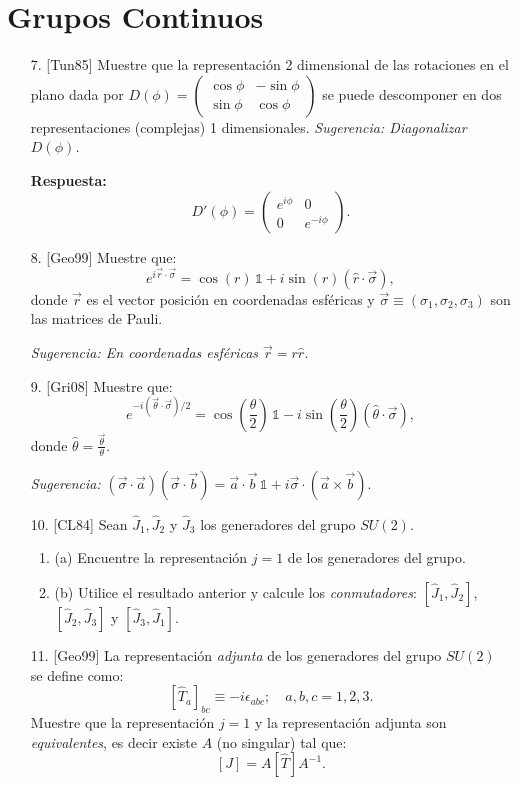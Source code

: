 \documentclass[a4paper,12pt]{article}
\begin{document}
\section*{Grupos Continuos}

\begin{enumerate}
    \item [7.] [Tun85] Muestre que la representación 2 dimensional de las rotaciones en el plano dada por $D(\phi) = \begin{pmatrix} \cos \phi & -\sin \phi \\ \sin \phi & \cos \phi \end{pmatrix}$ se puede descomponer en dos representaciones (complejas) 1 dimensionales. \textit{Sugerencia: Diagonalizar $D(\phi)$.}

    \textbf{Respuesta:}
    $$
    D'(\phi) = \begin{pmatrix} e^{i\phi} & 0 \\ 0 & e^{-i\phi} \end{pmatrix}.
    $$

    \item [8.] [Geo99] Muestre que:
    $$
    e^{i\vec{r} \cdot \vec{\sigma}} = \cos(r) \, \mathbb{1} + i \sin(r) (\hat{r} \cdot \vec{\sigma}),
    $$
    donde $\vec{r}$ es el vector posición en coordenadas esféricas y $\vec{\sigma} \equiv (\sigma_1, \sigma_2, \sigma_3)$ son las matrices de Pauli.

    \textit{Sugerencia: En coordenadas esféricas $\vec{r} = r \hat{r}$.}

    \item [9.] [Gri08] Muestre que:
    $$
    e^{-i(\vec{\theta} \cdot \vec{\sigma})/2} = \cos\left(\frac{\theta}{2}\right) \, \mathbb{1} - i \sin\left(\frac{\theta}{2}\right) (\hat{\theta} \cdot \vec{\sigma}),
    $$
    donde $\hat{\theta} = \frac{\vec{\theta}}{\theta}$.

    \textit{Sugerencia:} $(\vec{\sigma} \cdot \vec{a})(\vec{\sigma} \cdot \vec{b}) = \vec{a} \cdot \vec{b} \, \mathbb{1} + i \vec{\sigma} \cdot (\vec{a} \times \vec{b})$.

    \item [10.] [CL84] Sean $\hat{J}_1, \hat{J}_2$ y $\hat{J}_3$ los generadores del grupo $SU(2)$.
    \begin{enumerate}
        \item (a) Encuentre la representación $j = 1$ de los generadores del grupo.
        \item (b) Utilice el resultado anterior y calcule los \textit{conmutadores}: $[\hat{J}_1, \hat{J}_2]$, $[\hat{J}_2, \hat{J}_3]$ y $[\hat{J}_3, \hat{J}_1]$.
    \end{enumerate}

    \item [11.] [Geo99] La representación \textit{adjunta} de los generadores del grupo $SU(2)$ se define como:
    $$
    [\hat{T}_a]_{bc} \equiv -i \epsilon_{abc}; \quad a, b, c = 1, 2, 3.
    $$
    Muestre que la representación $j = 1$ y la representación adjunta son \textit{equivalentes}, es decir existe $A$ (no singular) tal que:
    $$
    [J] = A[\hat{T}]A^{-1}.
    $$
\end{enumerate}
\end{document}

